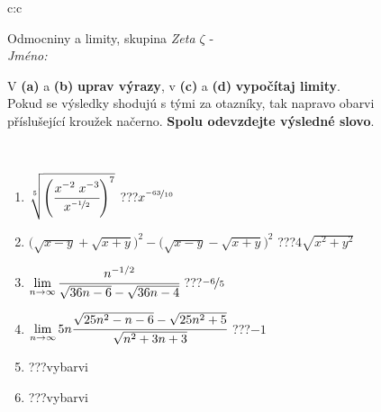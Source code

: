 \documentclass[10pt]{report}
\begin{document}
\newpage
\thispagestyle{empty}
\begin{tabular}{c:c}
\begin{minipage}[c][104.5mm][t]{0.5\linewidth}
\begin{center}
\vspace{7mm}
{\huge Odmocniny a limity, skupina \textit{Zeta $\zeta$} -}\\[5mm]
\textit{Jméno:}\phantom{xxxxxxxxxxxxxxxxxxxxxxxxxxxxxxxxxxxxxxxxxxxxxxxxxxxxxxxxxxxxxxxxx}\\[5mm]
\begin{minipage}{0.95\linewidth}
\begin{center}
V \textbf{(a)} a \textbf{(b)} \textbf{uprav výrazy}, v \textbf{(c)} a \textbf{(d)} \textbf{vypočítaj limity}.\\Pokud se výsledky shodujú s tými za otazníky, tak napravo obarvi\\příslušející kroužek načerno. \textbf{Spolu odevzdejte výsledné slovo}.
\end{center}
\end{minipage}
\\[1mm]
\begin{minipage}{0.79\linewidth}
\begin{center}
\begin{varwidth}{\linewidth}
\begin{enumerate}
\small
\item $\sqrt[5]{\left(\cfrac{x^{-2}\;x^{-3}}{x^{\nicefrac{-1}{2}}}\right)^{7}}$\quad \dotfill\; ???\;\dotfill \quad $x^{\nicefrac{-63}{10}}$
\item {\footnotesize{\scriptsize$\big(\sqrt{x-y}+\sqrt{x+y}\big)^2-\big(\sqrt{x-y}-\sqrt{x+y}\big)^2$}\quad \dotfill\; ???\;\dotfill \quad $4\sqrt{x^2+y^2}$}
\item $\lim\limits_{n\to\infty}\cfrac{n^{-1/2}}{\sqrt{36n-6}-\sqrt{36n-4}}$\quad \dotfill\; ???\;\dotfill \quad $\nicefrac{-6}{5}$
\item $\lim\limits_{n\to\infty}5n\cfrac{\sqrt{25n^2-n-6}-\sqrt{25n^2+5}}{\sqrt{n^2+3n+3}}$\quad \dotfill\; ???\;\dotfill \quad $-1$
\item \quad \dotfill\; ???\;\dotfill \quad vybarvi
\item \quad \dotfill\; ???\;\dotfill \quad vybarvi
\end{enumerate}
\end{varwidth}
\end{center}
\end{minipage}
\begin{minipage}{0.20\linewidth}

\end{minipage}
\end{center}
\end{minipage}
\end{tabular}
\end{document}
